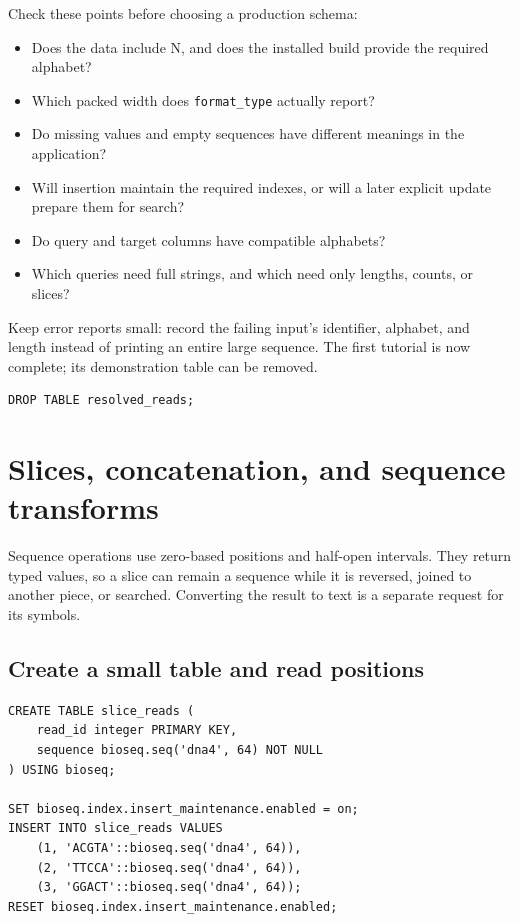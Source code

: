 Check these points before choosing a production schema:
\begin{itemize}
  \item Does the data include N, and does the installed build provide the
    required alphabet?
  \item Which packed width does \texttt{format\_type} actually report?
  \item Do missing values and empty sequences have different meanings in
    the application?
  \item Will insertion maintain the required indexes, or will a later
    explicit update prepare them for search?
  \item Do query and target columns have compatible alphabets?
  \item Which queries need full strings, and which need only lengths,
    counts, or slices?
\end{itemize}

Keep error reports small: record the failing input's identifier, alphabet,
and length instead of printing an entire large sequence. The first tutorial
is now complete; its demonstration table can be removed.

\par\noindent\begin{minipage}{\linewidth}
\begin{lstlisting}[style=bioseq-appendix-sql]
DROP TABLE resolved_reads;
\end{lstlisting}
\end{minipage}

\section{Slices, concatenation, and sequence transforms}
\label{sec:appendix-sequence-transforms}

Sequence operations use zero-based positions and half-open intervals.
They return typed values, so a slice can remain a sequence while it is
reversed, joined to another piece, or searched. Converting the result to
text is a separate request for its symbols.

\subsection{Create a small table and read positions}

\par\noindent\begin{minipage}{\linewidth}
\begin{lstlisting}[style=bioseq-appendix-sql]
CREATE TABLE slice_reads (
    read_id integer PRIMARY KEY,
    sequence bioseq.seq('dna4', 64) NOT NULL
) USING bioseq;

SET bioseq.index.insert_maintenance.enabled = on;
INSERT INTO slice_reads VALUES
    (1, 'ACGTA'::bioseq.seq('dna4', 64)),
    (2, 'TTCCA'::bioseq.seq('dna4', 64)),
    (3, 'GGACT'::bioseq.seq('dna4', 64));
RESET bioseq.index.insert_maintenance.enabled;
\end{lstlisting}
\end{minipage}

